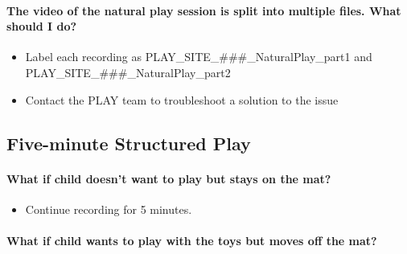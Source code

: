 \documentclass[
]{book}
\providecommand{\tightlist}{%
  \setlength{\itemsep}{0pt}\setlength{\parskip}{0pt}}
\begin{document}
\hypertarget{the-video-of-the-natural-play-session-is-split-into-multiple-files.-what-should-i-do}{%
\paragraph*{The video of the natural play session is split into multiple files. What should I do?}\label{the-video-of-the-natural-play-session-is-split-into-multiple-files.-what-should-i-do}}

\begin{itemize}
\tightlist
\item
  Label each recording as PLAY\_SITE\_\#\#\#\_NaturalPlay\_part1 and PLAY\_SITE\_\#\#\#\_NaturalPlay\_part2
\item
  Contact the PLAY team to troubleshoot a solution to the issue
\end{itemize}

\hypertarget{faqs_structured_play}{%
\subsection{Five-minute Structured Play}\label{faqs_structured_play}}

\hypertarget{what-if-child-doesnt-want-to-play-but-stays-on-the-mat}{%
\paragraph*{What if child doesn't want to play but stays on the mat?}\label{what-if-child-doesnt-want-to-play-but-stays-on-the-mat}}

\begin{itemize}
\tightlist
\item
  Continue recording for 5 minutes.
\end{itemize}

\hypertarget{what-if-child-wants-to-play-with-the-toys-but-moves-off-the-mat}{%
\paragraph*{What if child wants to play with the toys but moves off the mat?}\label{what-if-child-wants-to-play-with-the-toys-but-moves-off-the-mat}}
\end{document}
